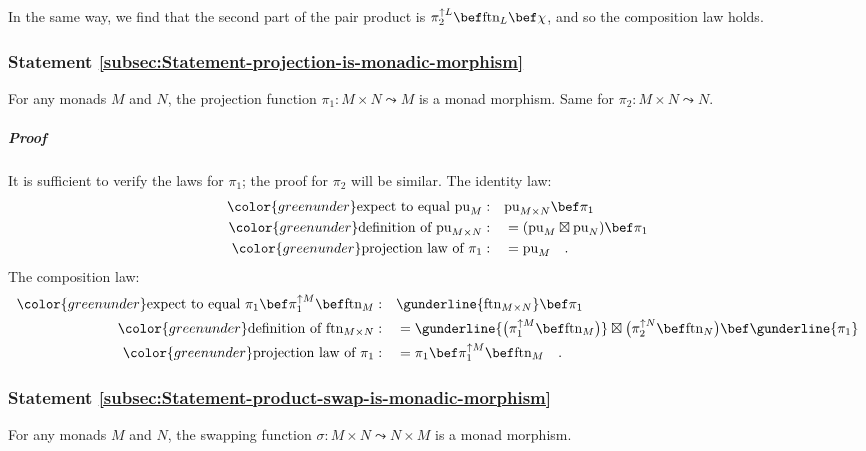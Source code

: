 In the same way, we find that the second part of the pair product
is $\pi_{2}^{\uparrow L}\bef\text{ftn}_{L}\bef\chi$, and so the composition
law holds.

\subsubsection{Statement \label{subsec:Statement-projection-is-monadic-morphism}\ref{subsec:Statement-projection-is-monadic-morphism}}

For any monads $M$ and $N$, the projection function $\pi_{1}:M\times N\leadsto M$
is a monad morphism. Same for $\pi_{2}:M\times N\leadsto N$.

\subparagraph{Proof}

It is sufficient to verify the laws for $\pi_{1}$; the proof for
$\pi_{2}$ will be similar. The identity law:
\begin{align*}
{\color{greenunder}\text{expect to equal }\text{pu}_{M}:}\quad & \text{pu}_{M\times N}\bef\pi_{1}\\
{\color{greenunder}\text{definition of }\text{pu}_{M\times N}:}\quad & =(\text{pu}_{M}\boxtimes\text{pu}_{N})\bef\pi_{1}\\
{\color{greenunder}\text{projection law of }\pi_{1}:}\quad & =\text{pu}_{M}\quad.
\end{align*}
The composition law:
\begin{align*}
{\color{greenunder}\text{expect to equal }\pi_{1}\bef\pi_{1}^{\uparrow M}\bef\text{ftn}_{M}:}\quad & \gunderline{\text{ftn}_{M\times N}}\bef\pi_{1}\\
{\color{greenunder}\text{definition of }\text{ftn}_{M\times N}:}\quad & =\gunderline{\big(\pi_{1}^{\uparrow M}\bef\text{ftn}_{M}\big)}\boxtimes\big(\pi_{2}^{\uparrow N}\bef\text{ftn}_{N}\big)\bef\gunderline{\pi_{1}}\\
{\color{greenunder}\text{projection law of }\pi_{1}:}\quad & =\pi_{1}\bef\pi_{1}^{\uparrow M}\bef\text{ftn}_{M}\quad.
\end{align*}


\subsubsection{Statement \label{subsec:Statement-product-swap-is-monadic-morphism}\ref{subsec:Statement-product-swap-is-monadic-morphism}}

For any monads $M$ and $N$, the swapping function $\sigma:M\times N\leadsto N\times M$
is a monad morphism.

